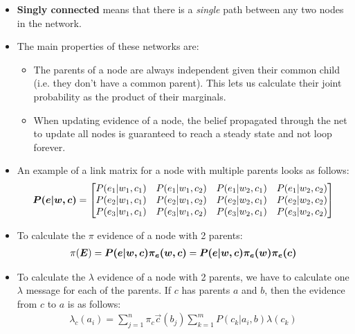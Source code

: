 \documentclass[12pt,twoside]{article}
\begin{document}
\begin{itemize}
    \item \textbf{Singly connected} means that there is a \textit{single} path between any two nodes in the network. 
    \item The main properties of these networks are:
        \begin{itemize}
            \item The parents of a node are always independent given their common child (i.e. they don't have a common parent). This lets us calculate their joint probability as the product of their marginals.
            \item When updating evidence of a node, the belief propagated through the net to update all nodes is guaranteed to reach a steady state and not loop forever.
        \end{itemize}
    \item An example of a link matrix for a node with multiple parents looks as follows:
        \begin{align}
            {\boldsymbol{{P(e|w,c)}}} = \begin{bmatrix} P(e_1|w_1,c_1) & P(e_1|w_1,c_2) & P(e_1|w_2,c_1) & P(e_1|w_2,c_2)\\ P(e_2|w_1,c_1) & P(e_2|w_1,c_2) & P(e_2|w_2,c_1) & P(e_2|w_2,c_2) \\ P(e_3|w_1,c_1) & P(e_3|w_1,c_2) & P(e_3|w_2,c_1) & P(e_3|w_2,c_2) \end{bmatrix}
        \end{align}
    \item To calculate the \(\pi\) evidence of a node with 2 parents: 
        \begin{align} 
            \pi({\boldsymbol{{E}}}) = {\boldsymbol{{P(e|w,c)}}}{\boldsymbol{{\pi_e(w,c)}}} = {\boldsymbol{{P(e|w,c)}}}{\boldsymbol{{\pi_e(w)\pi_e(c)}}}
        \end{align}
    \item To calculate the \(\lambda\) evidence of a node with 2 parents, we have to calculate one \(\lambda\) message for each of the parents. If \(c\) has parents \(a\) and \(b\), then the evidence from \(c\) to \(a\) is as follows: 
        \begin{align} 
            \lambda_c(a_i) = \sum_{j=1}^n\pi_{c}\vec{c}(b_j)\sum_{k=1}^m P(c_k|a_i,b)\lambda(c_k)
        \end{align}


\end{itemize}
\end{document}
